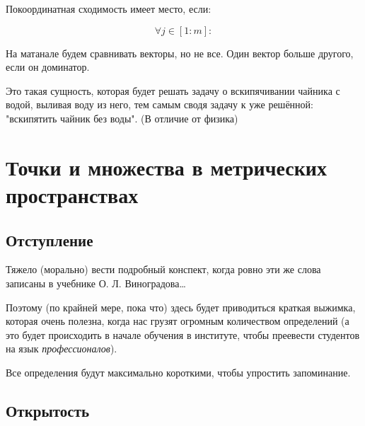 \documentclass[12pt, a4paper]{article}
\begin{document}
  \begin{corollary}

  \end{corollary}

  \begin{definition}
    Покоординатная сходимость имеет место, если:

    \begin{equation}
      \forall j \in [1 : m]: 
    \end{equation}
  \end{definition}

  На матанале будем сравнивать векторы, но не все. Один вектор больше другого, если он доминатор.


  \begin{definition}
    [Математик]
    Это такая сущность, которая будет решать задачу о вскипячивании чайника с водой, 
    выливая воду из него, тем самым сводя задачу к уже решённой: "вскипятить чайник без воды". (В отличие от физика)
  \end{definition}



  \section{Точки и множества в метрических пространствах}
  
  \subsection{Отступление}

  Тяжело (морально) вести подробный конспект, 
  когда ровно эти же слова записаны в учебнике О. Л. Виноградова\dots

  Поэтому (по крайней мере, пока что) здесь будет приводиться краткая выжимка, 
  которая очень полезна, когда нас грузят огромным количеством определений 
  (а это будет происходить в начале обучения в институте, чтобы преевести студентов на 
  язык \textit{профессионалов}).

  Все определения будут максимально короткими, чтобы упростить запоминание.

  \ornamentbreak %

  \subsection{Открытость}
\end{document}
